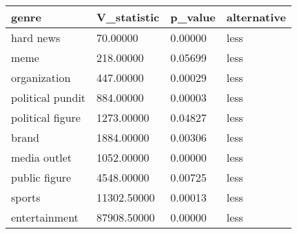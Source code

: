 \begin{table}
\centering
\begin{tabular}[t]{llll}
\toprule
genre & V\_statistic & p\_value & alternative\\
\midrule
hard news & 70.00000 & 0.00000 & less\\
meme & 218.00000 & 0.05699 & less\\
organization & 447.00000 & 0.00029 & less\\
political pundit & 884.00000 & 0.00003 & less\\
political figure & 1273.00000 & 0.04827 & less\\
brand & 1884.00000 & 0.00306 & less\\
media outlet & 1052.00000 & 0.00000 & less\\
public figure & 4548.00000 & 0.00725 & less\\
sports & 11302.50000 & 0.00013 & less\\
entertainment & 87908.50000 & 0.00000 & less\\
\bottomrule
\end{tabular}
\end{table}

